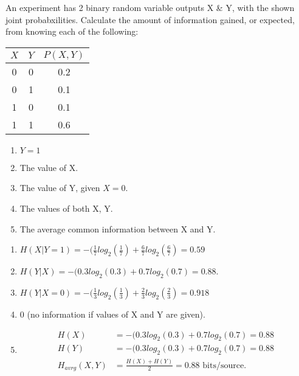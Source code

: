 \begin{question}
An experiment has 2 binary random variable outputs X \& Y, with
the shown joint probabxilities. Calculate the amount of
information gained, or expected, from knowing each of the
following:

\begin{table}[h]
\renewcommand{\arraystretch}{1.3}
\centering
\begin{tabular}{c||c|c}
\hline
\bfseries $X$ & \bfseries $Y$ & $P(X,Y)$\\
\hline\hline	
0 & 0 & 0.2 \\
0 & 1 & 0.1 \\
1 & 0 & 0.1 \\
1 & 1 & 0.6 \\
\hline
\end{tabular}
\end{table} 

\begin{enumerate}
\item $Y=1$
\item The value of X. 
\item The value of Y, given $X=0$.
\item The values of both X, Y.
\item The average common information between X and Y.
\end{enumerate}
\end{question}
\begin{solution}
\begin{enumerate}

\item $H(X|Y=1)=-(\frac{1}{7}
log_2(\frac{1}{7}) + \frac{6}{7}
log_2(\frac{6}{7}) = 0.59$
\item $H(Y|X)=-(0.3log_2(0.3) + 0.7log_2(0.7) = 0.88$. 
\item  $H(Y|X=0)=-(\frac{1}{3}
log_2(\frac{1}{3}) + \frac{2}{3}
log_2(\frac{2}{3}) = 0.918$
\item 0 (no information if values of X and Y are given).
\item \begin{equation}
\begin{aligned}
H(X) &= -(0.3log_2(0.3) + 0.7log_2(0.7) = 0.88\\
H(Y) &= -(0.3log_2(0.3) + 0.7log_2(0.7) = 0.88\\
H_{avrg}(X,Y) &= \frac{H(X)+H(Y)}{2} = 0.88 \text{ bits/source}.
\end{aligned}
\end{equation}

\end{enumerate}
\end{solution}



